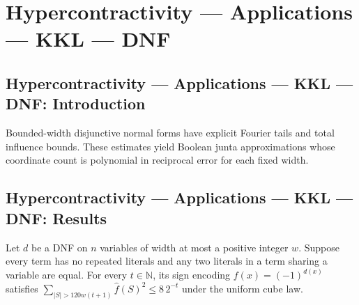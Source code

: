 \section{Hypercontractivity --- Applications --- KKL --- DNF}
\subsection*{Hypercontractivity --- Applications --- KKL --- DNF: Introduction}
Bounded-width disjunctive normal forms have explicit Fourier tails and total influence bounds. These estimates yield Boolean junta approximations whose coordinate count is polynomial in reciprocal error for each fixed width.

\subsection*{Hypercontractivity --- Applications --- KKL --- DNF: Results}

\begin{theorem}
\leanok
{}
Let $d$ be a DNF on $n$ variables of width at most a positive integer $w$. Suppose every term has no repeated literals and any two literals in a term sharing a variable are equal. For every $t\in\mathbb N$, its sign encoding $f(x)=(-1)^{d(x)}$ satisfies $\sum_{|S|>120w(t+1)}\widehat f(S)^2\le8\,2^{-t}$ under the uniform cube law.
\end{theorem}

